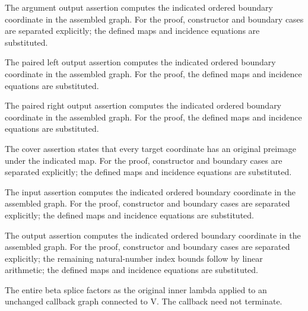 The argument output assertion computes the indicated ordered boundary coordinate in the assembled graph.
For the proof, constructor and boundary cases are separated explicitly; the defined maps and incidence equations are substituted.
\par{}

The paired left output assertion computes the indicated ordered boundary coordinate in the assembled graph.
For the proof, the defined maps and incidence equations are substituted.
\par{}

The paired right output assertion computes the indicated ordered boundary coordinate in the assembled graph.
For the proof, the defined maps and incidence equations are substituted.
\par{}

The cover assertion states that every target coordinate has an original preimage under the indicated map.
For the proof, constructor and boundary cases are separated explicitly; the defined maps and incidence equations are substituted.
\par{}

The input assertion computes the indicated ordered boundary coordinate in the assembled graph.
For the proof, constructor and boundary cases are separated explicitly; the defined maps and incidence equations are substituted.
\par{}

The output assertion computes the indicated ordered boundary coordinate in the assembled graph.
For the proof, constructor and boundary cases are separated explicitly; the remaining natural-number index bounds follow by linear arithmetic; the defined maps and incidence equations are substituted.
\par{}

The entire beta splice factors as the original inner lambda applied to an unchanged callback graph connected to V. The callback need not terminate.
\par{}

